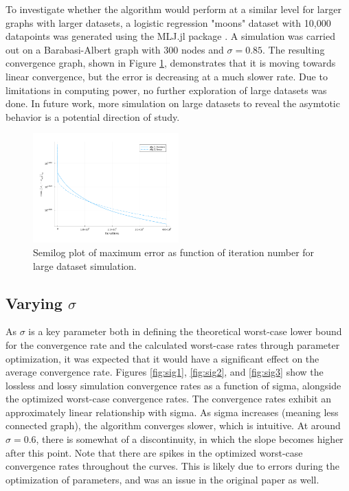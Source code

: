 \documentclass[conference]{IEEEtran}
\begin{document}
To investigate whether the algorithm would perform at a similar level for larger graphs with larger datasets, a logistic 
regression "moons" dataset with 10,000 datapoints was generated using the MLJ.jl package \autocite{Blaom2020}. A simulation was carried out on a 
Barabasi-Albert graph with 300 nodes and $\sigma = 0.85$. The resulting convergence graph, shown in Figure \ref{fig:large_n}, 
demonstrates that it is moving towards linear convergence, but the error is decreasing at a much slower rate. Due to limitations in
computing power, no further exploration of large datasets was done. In future work, more simulation on large datasets to reveal the asymtotic behavior
is a potential direction of study. 
\begin {figure}[h]
    \centering
    \includegraphics[width=0.5\textwidth]{large_n.png}
    \caption{Semilog plot of maximum error as function of iteration number for large dataset simulation.}
    \label{fig:large_n}
\end{figure}

\subsection{Varying $\sigma$}
As $\sigma$ is a key parameter both in defining the theoretical worst-case lower bound for the convergence rate and the calculated worst-case rates through
parameter optimization, it was expected that it would have a significant effect on the average convergence rate. Figures \ref{fig:sig1}, \ref{fig:sig2}, and \ref{fig:sig3}
show the lossless and lossy simulation convergence rates as a function of sigma, alongside the optimized worst-case convergence rates. The 
convergence rates exhibit an approximately linear relationship with sigma. As sigma increases (meaning less connected graph), the algorithm converges slower, which is intuitive. 
At around $\sigma = 0.6$, there is somewhat of a discontinuity, in which the slope becomes higher after this point. Note that there are spikes in the optimized worst-case convergence rates
throughout the curves. This is likely due to errors during the optimization of parameters, and was an issue in the original paper as well.
\end{document}
